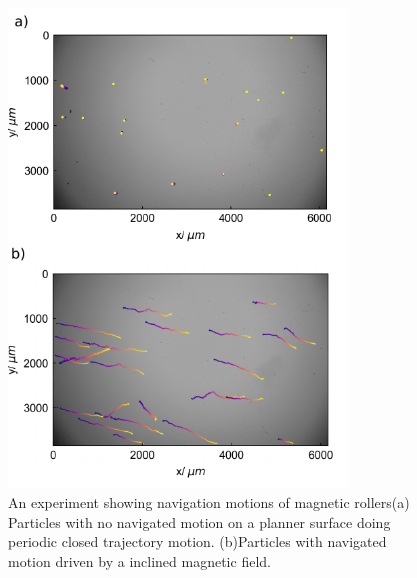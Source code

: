  \begin{figure}[p]
\centering
\includegraphics[width=9cm]{figures/5_6.pdf}
\caption{An experiment showing navigation motions of magnetic rollers(a) Particles with no navigated motion on a planner surface doing periodic closed trajectory motion.  (b)Particles with navigated motion driven by a inclined magnetic field.}
\label{fig:1}
\end{figure}

